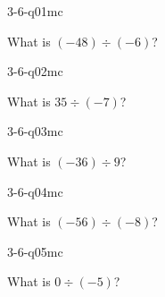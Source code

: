 

\begin{practiceQuestion}{3-6-q01}{mc}
\begin{questionText}
What is $(-48) \div (-6)$?
\end{questionText}
\end{practiceQuestion}

\begin{practiceQuestion}{3-6-q02}{mc}
\begin{questionText}
What is $35 \div (-7)$?
\end{questionText}
\end{practiceQuestion}

\begin{practiceQuestion}{3-6-q03}{mc}
\begin{questionText}
What is $(-36) \div 9$?
\end{questionText}
\end{practiceQuestion}

\begin{practiceQuestion}{3-6-q04}{mc}
\begin{questionText}
What is $(-56) \div (-8)$?
\end{questionText}
\end{practiceQuestion}

\begin{practiceQuestion}{3-6-q05}{mc}
\begin{questionText}
What is $0 \div (-5)$?
\end{questionText}
\end{practiceQuestion}

